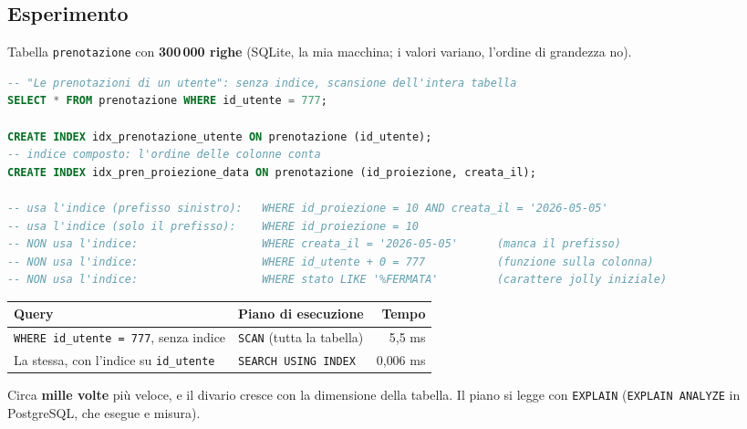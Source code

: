 \subsection{Esperimento}
Tabella \texttt{prenotazione} con \textbf{300\,000 righe} (SQLite, la mia macchina; i valori variano, l'ordine di grandezza no).
\begin{lstlisting}[language=SQL, caption={Indici semplici e composti; quando NON vengono usati}]
-- "Le prenotazioni di un utente": senza indice, scansione dell'intera tabella
SELECT * FROM prenotazione WHERE id_utente = 777;

CREATE INDEX idx_prenotazione_utente ON prenotazione (id_utente);
-- indice composto: l'ordine delle colonne conta
CREATE INDEX idx_pren_proiezione_data ON prenotazione (id_proiezione, creata_il);

-- usa l'indice (prefisso sinistro):   WHERE id_proiezione = 10 AND creata_il = '2026-05-05'
-- usa l'indice (solo il prefisso):    WHERE id_proiezione = 10
-- NON usa l'indice:                   WHERE creata_il = '2026-05-05'      (manca il prefisso)
-- NON usa l'indice:                   WHERE id_utente + 0 = 777           (funzione sulla colonna)
-- NON usa l'indice:                   WHERE stato LIKE '%FERMATA'         (carattere jolly iniziale)
\end{lstlisting}
\begin{center}
\small
\begin{tabularx}{\textwidth}{@{}>{\raggedright\arraybackslash}p{6.4cm}>{\raggedright\arraybackslash}p{4.5cm}r@{}}
\toprule
\textbf{Query} & \textbf{Piano di esecuzione} & \textbf{Tempo} \\
\midrule
\texttt{WHERE id\_utente = 777}, senza indice & \texttt{SCAN} (tutta la tabella) & 5{,}5 ms \\
La stessa, con l'indice su \texttt{id\_utente} & \texttt{SEARCH USING INDEX} & 0{,}006 ms \\
\bottomrule
\end{tabularx}
\end{center}
Circa \textbf{mille volte} più veloce, e il divario cresce con la dimensione della tabella. Il piano si legge con \texttt{EXPLAIN} (\texttt{EXPLAIN ANALYZE} in PostgreSQL, che esegue e misura).

